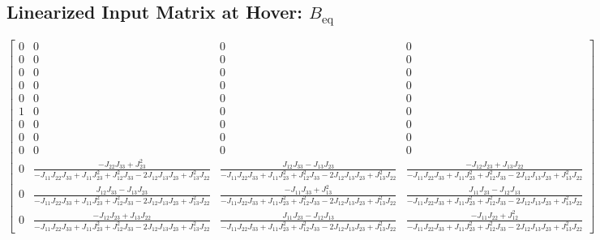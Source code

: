 \documentclass{article}
\begin{document}
\subsection*{Linearized Input Matrix at Hover: $B_{\text{eq}}$}
\[
\left[\begin{matrix}0 & 0 & 0 & 0\\0 & 0 & 0 & 0\\0 & 0 & 0 & 0\\0 & 0 & 0 & 0\\0 & 0 & 0 & 0\\1 & 0 & 0 & 0\\0 & 0 & 0 & 0\\0 & 0 & 0 & 0\\0 & 0 & 0 & 0\\0 & \frac{- J_{22} J_{33} + J_{23}^{2}}{- J_{11} J_{22} J_{33} + J_{11} J_{23}^{2} + J_{12}^{2} J_{33} - 2 J_{12} J_{13} J_{23} + J_{13}^{2} J_{22}} & \frac{J_{12} J_{33} - J_{13} J_{23}}{- J_{11} J_{22} J_{33} + J_{11} J_{23}^{2} + J_{12}^{2} J_{33} - 2 J_{12} J_{13} J_{23} + J_{13}^{2} J_{22}} & \frac{- J_{12} J_{23} + J_{13} J_{22}}{- J_{11} J_{22} J_{33} + J_{11} J_{23}^{2} + J_{12}^{2} J_{33} - 2 J_{12} J_{13} J_{23} + J_{13}^{2} J_{22}}\\0 & \frac{J_{12} J_{33} - J_{13} J_{23}}{- J_{11} J_{22} J_{33} + J_{11} J_{23}^{2} + J_{12}^{2} J_{33} - 2 J_{12} J_{13} J_{23} + J_{13}^{2} J_{22}} & \frac{- J_{11} J_{33} + J_{13}^{2}}{- J_{11} J_{22} J_{33} + J_{11} J_{23}^{2} + J_{12}^{2} J_{33} - 2 J_{12} J_{13} J_{23} + J_{13}^{2} J_{22}} & \frac{J_{11} J_{23} - J_{12} J_{13}}{- J_{11} J_{22} J_{33} + J_{11} J_{23}^{2} + J_{12}^{2} J_{33} - 2 J_{12} J_{13} J_{23} + J_{13}^{2} J_{22}}\\0 & \frac{- J_{12} J_{23} + J_{13} J_{22}}{- J_{11} J_{22} J_{33} + J_{11} J_{23}^{2} + J_{12}^{2} J_{33} - 2 J_{12} J_{13} J_{23} + J_{13}^{2} J_{22}} & \frac{J_{11} J_{23} - J_{12} J_{13}}{- J_{11} J_{22} J_{33} + J_{11} J_{23}^{2} + J_{12}^{2} J_{33} - 2 J_{12} J_{13} J_{23} + J_{13}^{2} J_{22}} & \frac{- J_{11} J_{22} + J_{12}^{2}}{- J_{11} J_{22} J_{33} + J_{11} J_{23}^{2} + J_{12}^{2} J_{33} - 2 J_{12} J_{13} J_{23} + J_{13}^{2} J_{22}}\end{matrix}\right]
\]
\end{document}
